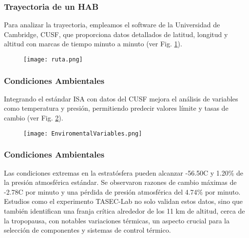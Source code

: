 
\begin{frame}
    \frametitle{Trayectoria de un HAB}
    Para analizar la trayectoria, empleamos el software de la Universidad de Cambridge, CUSF, que proporciona datos detallados de latitud, longitud y altitud con marcas de tiempo minuto a minuto (ver Fig. \ref{fig:ruta}).    
    \begin{figure}[H]
        \centering
        \texttt{[image: ruta.png]} %
        \label{fig:ruta}
    \end{figure}
    
\end{frame}


\begin{frame}
    \frametitle{Condiciones Ambientales}

Integrando el estándar ISA con datos del CUSF mejora el análisis de variables como temperatura y presión, permitiendo predecir valores límite y tasas de cambio (ver Fig. \ref{fig:enviromentalV}).
      \begin{figure}[H]
        \centering
        \texttt{[image: EnviromentalVariables.png]} %
        \label{fig:enviromentalV}
    \end{figure}
    
\end{frame}



\begin{frame}
\frametitle{Condiciones Ambientales}

Las condiciones extremas en la estratósfera pueden alcanzar -56.50\textdegree{}C y 1.20\% de la presión atmosférica estándar. Se observaron razones de cambio máximas de -2.78\textdegree{}C por minuto y una pérdida de presión atmosférica del 4.74\% por minuto.\\ 
\vspace*{0.5 cm}
Estudios como el experimento TASEC-Lab \cite{TASEC} no solo validan estos datos, sino que también identifican una franja crítica alrededor de los 11 km de altitud, cerca de la tropopausa, con notables variaciones térmicas, un aspecto crucial para la selección de componentes y sistemas de control térmico.

   
\end{frame}



